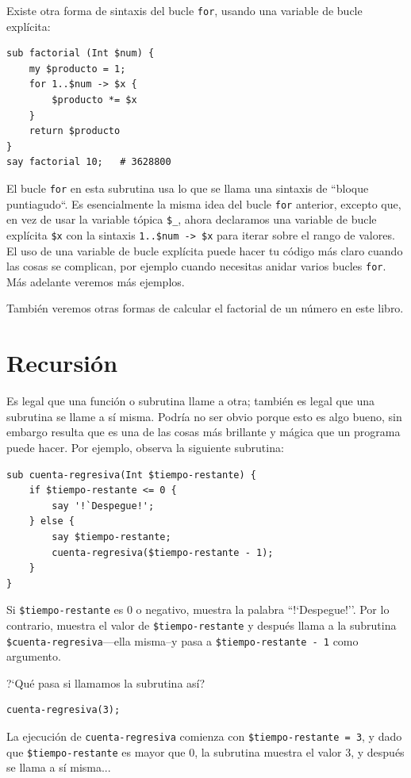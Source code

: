 Existe otra forma de sintaxis del bucle {\tt for}, usando una variable
de bucle explícita:

\begin{lstlisting}
sub factorial (Int $num) { 
    my $producto = 1;  
    for 1..$num -> $x { 
        $producto *= $x
    }
    return $producto
}
say factorial 10;   # 3628800
\end{lstlisting} 

El bucle {\tt for} en esta subrutina usa lo que se llama una
sintaxis de ``bloque puntiagudo``. Es esencialmente la misma
idea del bucle {\tt for} anterior, excepto que, en vez de usar
la variable tópica \verb|$_|, ahora declaramos una variable de
bucle explícita \verb|$x| con la sintaxis \verb|1..$num -> $x|
para iterar sobre el rango de valores. El uso de una variable de
bucle explícita puede hacer tu código más claro cuando las cosas
se complican, por ejemplo cuando necesitas anidar varios bucles
{\tt for}. Más adelante veremos más ejemplos.

También veremos otras formas de calcular el factorial de un
número en este libro.

\section{Recursión}
\label{recursion}

Es legal que una función o subrutina llame a otra; también 
es legal que una subrutina se llame a sí misma. Podría no ser
obvio porque esto es algo bueno, sin embargo resulta que es una 
de las cosas más brillante y mágica que un programa puede hacer.
Por ejemplo, observa la siguiente subrutina:

\begin{lstlisting}
sub cuenta-regresiva(Int $tiempo-restante) {
    if $tiempo-restante <= 0 {
        say '!`Despegue!';
    } else {
        say $tiempo-restante;
        cuenta-regresiva($tiempo-restante - 1);
    }
}
\end{lstlisting}
%
Si {\tt \$tiempo-restante} es 0 o negativo, muestra
la palabra ``!`Despegue!''. Por lo contrario, muestra el valor de 
{\tt \$tiempo-restante} y después llama a la subrutina 
{\tt \$cuenta-regresiva}---ella misma--y pasa a
{\tt \$tiempo-restante - 1} como argumento.

?`Qué pasa si llamamos la subrutina así?

\begin{lstlisting}
cuenta-regresiva(3);
\end{lstlisting}
%
La ejecución de {\tt cuenta-regresiva} comienza con 
{\tt \$tiempo-restante = 3}, y dado que {\tt \$tiempo-restante}
es mayor que 0, la subrutina muestra el valor 3, y después
se llama a sí misma...

